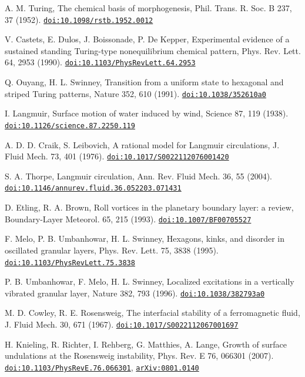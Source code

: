 \documentclass[11pt,a4paper]{article}
\begin{document}
\begin{description}[leftmargin=2.6em,labelwidth=2.2em,labelsep=0.4em,itemsep=1pt,parsep=0pt,font=\normalfont]
\item[{[19]}] A. M. Turing, The chemical basis of morphogenesis, Phil. Trans. R. Soc. B 237, 37 (1952). \href{https://doi.org/10.1098/rstb.1952.0012}{\nolinkurl{doi:10.1098/rstb.1952.0012}}
\item[{[20]}] V. Castets, E. Dulos, J. Boissonade, P. De Kepper, Experimental evidence of a sustained standing Turing-type nonequilibrium chemical pattern, Phys. Rev. Lett. 64, 2953 (1990). \href{https://doi.org/10.1103/PhysRevLett.64.2953}{\nolinkurl{doi:10.1103/PhysRevLett.64.2953}}
\item[{[21]}] Q. Ouyang, H. L. Swinney, Transition from a uniform state to hexagonal and striped Turing patterns, Nature 352, 610 (1991). \href{https://doi.org/10.1038/352610a0}{\nolinkurl{doi:10.1038/352610a0}}
\item[{[22]}] I. Langmuir, Surface motion of water induced by wind, Science 87, 119 (1938). \href{https://doi.org/10.1126/science.87.2250.119}{\nolinkurl{doi:10.1126/science.87.2250.119}}
\item[{[23]}] A. D. D. Craik, S. Leibovich, A rational model for Langmuir circulations, J. Fluid Mech. 73, 401 (1976). \href{https://doi.org/10.1017/S0022112076001420}{\nolinkurl{doi:10.1017/S0022112076001420}}
\item[{[24]}] S. A. Thorpe, Langmuir circulation, Ann. Rev. Fluid Mech. 36, 55 (2004). \href{https://doi.org/10.1146/annurev.fluid.36.052203.071431}{\nolinkurl{doi:10.1146/annurev.fluid.36.052203.071431}}
\item[{[25]}] D. Etling, R. A. Brown, Roll vortices in the planetary boundary layer: a review, Boundary-Layer Meteorol. 65, 215 (1993). \href{https://doi.org/10.1007/BF00705527}{\nolinkurl{doi:10.1007/BF00705527}}
\item[{[26]}] F. Melo, P. B. Umbanhowar, H. L. Swinney, Hexagons, kinks, and disorder in oscillated granular layers, Phys. Rev. Lett. 75, 3838 (1995). \href{https://doi.org/10.1103/PhysRevLett.75.3838}{\nolinkurl{doi:10.1103/PhysRevLett.75.3838}}
\item[{[27]}] P. B. Umbanhowar, F. Melo, H. L. Swinney, Localized excitations in a vertically vibrated granular layer, Nature 382, 793 (1996). \href{https://doi.org/10.1038/382793a0}{\nolinkurl{doi:10.1038/382793a0}}
\item[{[28]}] M. D. Cowley, R. E. Rosensweig, The interfacial stability of a ferromagnetic fluid, J. Fluid Mech. 30, 671 (1967). \href{https://doi.org/10.1017/S0022112067001697}{\nolinkurl{doi:10.1017/S0022112067001697}}
\item[{[29]}] H. Knieling, R. Richter, I. Rehberg, G. Matthies, A. Lange, Growth of surface undulations at the Rosensweig instability, Phys. Rev. E 76, 066301 (2007). \href{https://doi.org/10.1103/PhysRevE.76.066301}{\nolinkurl{doi:10.1103/PhysRevE.76.066301}}, \href{https://arxiv.org/abs/0801.0140}{\nolinkurl{arXiv:0801.0140}}

\end{description}
\end{document}
